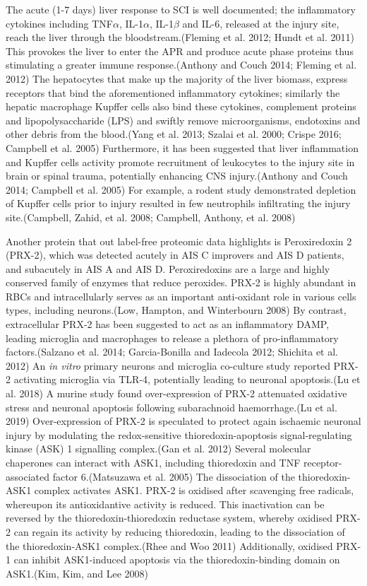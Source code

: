 \documentclass[
]{article}
\begin{document}
\begin{landscape}
\begin{landscape}
The acute (1-7 days) liver response to SCI is well documented; the inflammatory cytokines including TNF\(\alpha\), IL-1\(\alpha\), IL-1\(\beta\) and IL-6, released at the injury site, reach the liver through the bloodstream.(Fleming et al. 2012; Hundt et al. 2011)
This provokes the liver to enter the APR and produce acute phase proteins thus stimulating a greater immune response.(Anthony and Couch 2014; Fleming et al. 2012)
The hepatocytes that make up the majority of the liver biomass, express receptors that bind the aforementioned inflammatory cytokines; similarly the hepatic macrophage Kupffer cells also bind these cytokines, complement proteins and lipopolysaccharide (LPS) and swiftly remove microorganisms, endotoxins and other debris from the blood.(Yang et al. 2013; Szalai et al. 2000; Crispe 2016; Campbell et al. 2005)
Furthermore, it has been suggested that liver inflammation and Kupffer cells activity promote recruitment of leukocytes to the injury site in brain or spinal trauma, potentially enhancing CNS injury.(Anthony and Couch 2014; Campbell et al. 2005)
For example, a rodent study demonstrated depletion of Kupffer cells prior to injury resulted in few neutrophils infiltrating the injury site.(Campbell, Zahid, et al. 2008; Campbell, Anthony, et al. 2008)

Another protein that out label-free proteomic data highlights is Peroxiredoxin 2 (PRX-2), which was detected acutely in AIS C improvers and AIS D patients, and subacutely in AIS A and AIS D. Peroxiredoxins are a large and highly conserved family of enzymes that reduce peroxides.
PRX-2 is highly abundant in RBCs and intracellularly serves as an important anti-oxidant role in various cells types, including neurons.(Low, Hampton, and Winterbourn 2008)
By contrast, extracellular PRX-2 has been suggested to act as an inflammatory DAMP, leading microglia and macrophages to release a plethora of pro-inflammatory factors.(Salzano et al. 2014; Garcia-Bonilla and Iadecola 2012; Shichita et al. 2012)
An \emph{in vitro} primary neurons and microglia co-culture study reported PRX-2 activating microglia via TLR-4, potentially leading to neuronal apoptosis.(Lu et al. 2018)
A murine study found over-expression of PRX-2 attenuated oxidative stress and neuronal apoptosis following subarachnoid haemorrhage.(Lu et al. 2019)
Over-expression of PRX-2 is speculated to protect again ischaemic neuronal injury by modulating the redox-sensitive thioredoxin-apoptosis signal-regulating kinase (ASK) 1 signalling complex.(Gan et al. 2012)
Several molecular chaperones can interact with ASK1, including thioredoxin and TNF receptor-associated factor 6.(Matsuzawa et al. 2005)
The dissociation of the thioredoxin-ASK1 complex activates ASK1.
PRX-2 is oxidised after scavenging free radicals, whereupon its antioxidantive activity is reduced.
This inactivation can be reversed by the thioredoxin-thioredoxin reductase system, whereby oxidised PRX-2 can regain its activity by reducing thioredoxin, leading to the dissociation of the thioredoxin-ASK1 complex.(Rhee and Woo 2011)
Additionally, oxidised PRX-1 can inhibit ASK1-induced apoptosis via the thioredoxin-binding domain on ASK1.(Kim, Kim, and Lee 2008)


\end{landscape}
\end{landscape}
\end{document}
